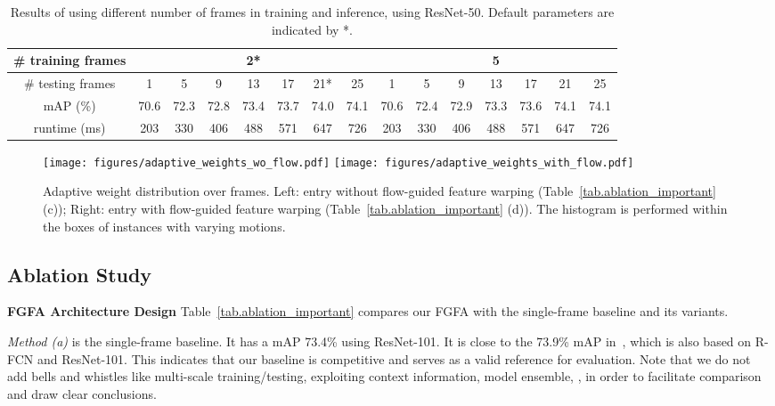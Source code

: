 \documentclass[10pt,twocolumn,letterpaper]{article}
\begin{document}
\setlength{\tabcolsep}{4pt}
\renewcommand{\arraystretch}{1.2}
\begin{table*}
\centering
\small
\begin{tabular}{c|c|c|c|c|c|c|c|c|c|c|c|c|c|c}
\hline
 \# training frames & \multicolumn{7}{c|}{ 2*} & \multicolumn{7}{c}{ 5} \\
\hline
\# testing frames & 1 & 5 & 9 & 13 & 17 & 21* & 25 & 1 & 5 & 9 & 13 & 17 & 21 & 25 \\
\hline \hline
mAP (\%) & 70.6 & 72.3 & 72.8 & 73.4 & 73.7 & 74.0 & 74.1 & 70.6 & 72.4 & 72.9 & 73.3 & 73.6 & 74.1 & 74.1\\
\hline
runtime (ms) & 203 & 330 & 406 & 488 & 571 & 647 & 726 & 203 & 330 & 406 & 488 & 571 & 647 & 726 \\
\hline
\end{tabular}
\caption{Results of using different number of frames in training and inference, using ResNet-50. Default parameters are indicated by *.}
\label{tab.ablation_num_frame}
\end{table*}



\begin{figure}
\begin{center}
\texttt{[image: figures/adaptive\_weights\_wo\_flow.pdf]} \texttt{[image: figures/adaptive\_weights\_with\_flow.pdf]} 
\end{center}
\caption{Adaptive weight distribution over frames. Left: entry without flow-guided feature warping (Table~\ref{tab.ablation_important} (c)); Right: entry with flow-guided feature warping (Table~\ref{tab.ablation_important} (d)). The histogram is performed within the boxes of instances with varying motions.}
\label{fig.adaptive_weights}\vspace{-0.5em}
\end{figure}

\subsection{Ablation Study}

\textbf{FGFA Architecture Design} Table~\ref{tab.ablation_important} compares our FGFA with the single-frame baseline and its variants.

\emph{Method (a)} is the single-frame baseline. It has a mAP 73.4\% using ResNet-101. It is close to the 73.9\% mAP in~\cite{zhu2016dff}, which is also based on R-FCN and ResNet-101. This indicates that our baseline is competitive and serves as a valid reference for evaluation. Note that we do not add bells and whistles like multi-scale training/testing, exploiting context information, model ensemble, \etc, in order to facilitate comparison and draw clear conclusions.
\end{document}
